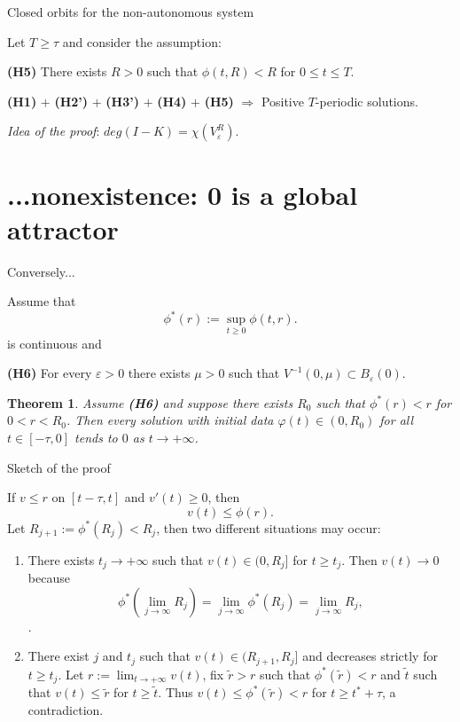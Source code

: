 \documentclass{beamer}
\newtheorem{thm}{Theorem}
\begin{document}
\begin{frame}{Closed orbits for the non-autonomous system}
    
Let $T\ge \tau$ and consider the assumption: 

\medskip

{\bf (H5)} 
There exists $R>0$ such that $\phi(t,R)<R$ for $0\le t\le T$. 

\bigskip 
\begin{theorem}
    {\bf (H1)} $+$ 
{\bf (H2')}
$+$ 
{\bf (H3')}
$+$ 
{\bf (H4)} $+$  {\bf (H5)}
$\Longrightarrow$ {Positive $T$-periodic solutions}.
\end{theorem}

\pause 
\textit{Idea of the proof}: $deg(I-K)= \chi(V_\varepsilon^R)$.
\end{frame}


\section{...nonexistence: 0 is a global attractor}

\begin{frame}{
Conversely...}
    
    Assume that 
    $$
\phi^*(r):= \sup_{t\ge 0} \phi(t,r).
$$
is continuous and

\medskip 

{\bf (H6)} 
For every $\varepsilon>0$
there exists $\mu>0$ such that $V^{-1}(0, \mu) \subset B_\varepsilon(0)$. 

\begin{thm}

Assume  {\bf (H6)} and suppose  there exists $R_0$ such that  $\phi^*(r)<r$ for $0<r<R_0$. 
Then every solution with initial data $\varphi(t)\in (0,R_0)$ for all $t\in [-\tau,0]$ tends to $0$ as $t\to +\infty$.  

\end{thm}

\end{frame}

\begin{frame}{Sketch of the proof}
    
If $v\le r$ on $[t-\tau, t]$ and
$v'(t)\ge 0$, then 
$$
v(t) \le \phi(r). 
$$
Let $R_{j+1}:= {\phi^*(R_j)}<R_j$, then two different situations may occur:

\begin{enumerate}
    \item There exists $t_j\to +\infty$ such that $v(t)\in (0,R_j]$ for $t\ge t_j$. Then $v(t)\to 0$ because
$$
\phi^*(\lim_{j\to \infty} R_j) = \lim_{j\to \infty} \phi^*(R_j)= \lim_{j\to \infty} R_j, 
$$.     
\item There exist $j$ and $t_j$ such that $v(t) \in (R_{j+1},R_j]$ and decreases strictly for $t\ge t_j$. Let 
 $r:=\lim_{t\to+\infty} v(t)$, fix $\tilde r>r$ such that $\phi^*(\tilde r)<r$ and $\tilde t$ such that $v(t)\le \tilde r$ for $t\ge \tilde t$. Thus 
$v(t)\le \phi^*(\tilde r)<r$ for $t\ge t^*+\tau$, a contradiction. 

\end{enumerate}

    
\end{frame}
\end{document}
